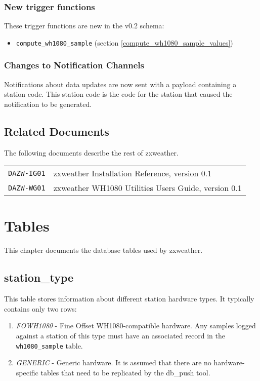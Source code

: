 \documentclass[a4paper,10pt]{book}
\begin{document}
\subsection{New trigger functions}
These trigger functions are new in the v0.2 schema:
\begin{itemize}
\item \verb|compute_wh1080_sample| (section \ref{compute_wh1080_sample_values})
\end{itemize}

\subsection{Changes to Notification Channels}
Notifications about data updates are now sent with a payload containing a station code. This station code is the code for the station that caused the notification to be generated.

\section{Related Documents}
The following documents describe the rest of zxweather.

\begin{tabular}{l l}
\verb|DAZW-IG01| & zxweather Installation Reference, version 0.1 \\
\verb|DAZW-WG01| & zxweather WH1080 Utilities Users Guide, version 0.1 \\
\end{tabular}

\chapter{Tables}
\label{cha_tables}

This chapter documents the database tables used by zxweather.

\section{station\_type}
\label{tbl_station_type}
This table stores information about different station hardware types. It typically contains only two rows:
\begin{enumerate}
\item \emph{FOWH1080} - Fine Offset WH1080-compatible hardware. Any samples logged against a station of this type must have an associated record in the \verb|wh1080_sample| table.
\item \emph{GENERIC} - Generic hardware. It is assumed that there are no hardware-specific tables that need to be replicated by the db\_push tool.
\end{enumerate}
\end{document}
